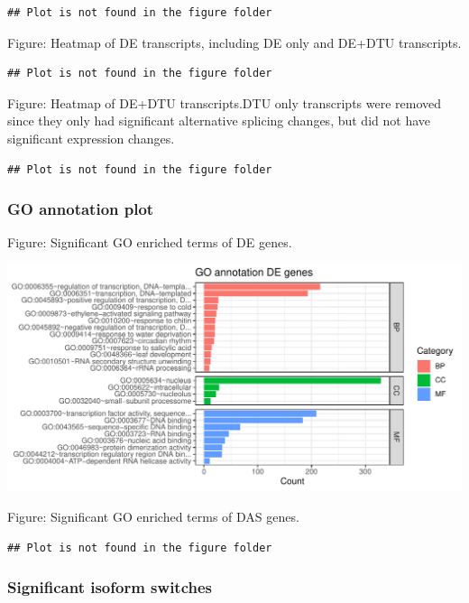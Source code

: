 \documentclass[]{article}
\begin{document}
\begin{verbatim}
## Plot is not found in the figure folder
\end{verbatim}

Figure: Heatmap of DE transcripts, including DE only and DE+DTU
transcripts.

\begin{verbatim}
## Plot is not found in the figure folder
\end{verbatim}

Figure: Heatmap of DE+DTU transcripts.DTU only transcripts were removed
since they only had significant alternative splicing changes, but did
not have significant expression changes.

\begin{verbatim}
## Plot is not found in the figure folder
\end{verbatim}

\subsubsection{GO annotation plot}\label{go-annotation-plot}

Figure: Significant GO enriched terms of DE genes.

\includegraphics[width=16.25in]{X2024.08.05.11.24.04.j284/figure/DE genes GO annotation plot}

Figure: Significant GO enriched terms of DAS genes.

\begin{verbatim}
## Plot is not found in the figure folder
\end{verbatim}

\subsubsection{Significant isoform
switches}\label{significant-isoform-switches}
\end{document}

